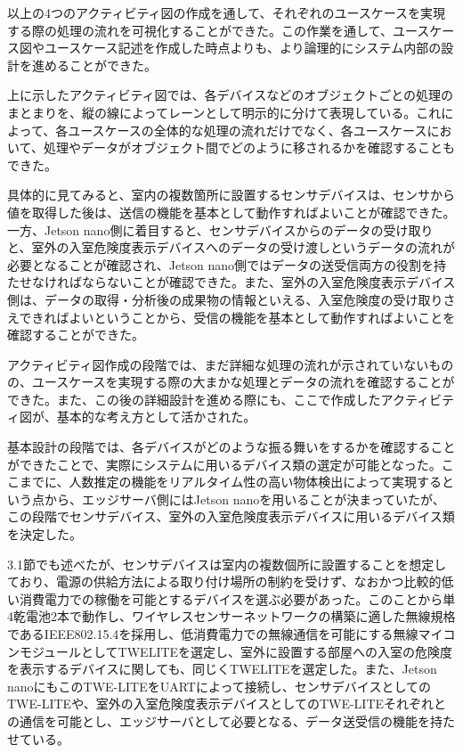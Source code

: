 以上の4つのアクティビティ図の作成を通して、それぞれのユースケースを実現する際の処理の流れを可視化することができた。この作業を通して、ユースケース図やユースケース記述を作成した時点よりも、より論理的にシステム内部の設計を進めることができた。

上に示したアクティビティ図では、各デバイスなどのオブジェクトごとの処理のまとまりを、縦の線によってレーンとして明示的に分けて表現している。これによって、各ユースケースの全体的な処理の流れだけでなく、各ユースケースにおいて、処理やデータがオブジェクト間でどのように移されるかを確認することもできた。

具体的に見てみると、室内の複数箇所に設置するセンサデバイスは、センサから値を取得した後は、送信の機能を基本として動作すればよいことが確認できた。一方、Jetson nano側に着目すると、センサデバイスからのデータの受け取りと、室外の入室危険度表示デバイスへのデータの受け渡しというデータの流れが必要となることが確認され、Jetson nano側ではデータの送受信両方の役割を持たせなければならないことが確認できた。また、室外の入室危険度表示デバイス側は、データの取得・分析後の成果物の情報といえる、入室危険度の受け取りさえできればよいということから、受信の機能を基本として動作すればよいことを確認することができた。

アクティビティ図作成の段階では、まだ詳細な処理の流れが示されていないものの、ユースケースを実現する際の大まかな処理とデータの流れを確認することができた。また、この後の詳細設計を進める際にも、ここで作成したアクティビティ図が、基本的な考え方として活かされた。

基本設計の段階では、各デバイスがどのような振る舞いをするかを確認することができたことで、実際にシステムに用いるデバイス類の選定が可能となった。ここまでに、人数推定の機能をリアルタイム性の高い物体検出によって実現するという点から、エッジサーバ側にはJetson nanoを用いることが決まっていたが、この段階でセンサデバイス、室外の入室危険度表示デバイスに用いるデバイス類を決定した。

3.1節でも述べたが、センサデバイスは室内の複数個所に設置することを想定しており、電源の供給方法による取り付け場所の制約を受けず、なおかつ比較的低い消費電力での稼働を可能とするデバイスを選ぶ必要があった。このことから単4乾電池2本で動作し、ワイヤレスセンサーネットワークの構築に適した無線規格であるIEEE802.15.4を採用し、低消費電力での無線通信を可能にする無線マイコンモジュールとしてTWELITEを選定し、室外に設置する部屋への入室の危険度を表示するデバイスに関しても、同じくTWELITEを選定した。また、Jetson nanoにもこのTWE-LITEをUARTによって接続し、センサデバイスとしてのTWE-LITEや、室外の入室危険度表示デバイスとしてのTWE-LITEそれぞれとの通信を可能とし、エッジサーバとして必要となる、データ送受信の機能を持たせている。

